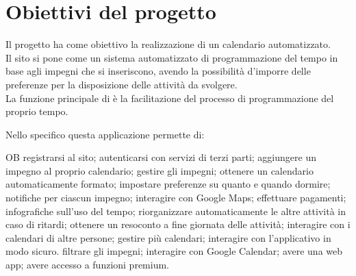 \section{Obiettivi del progetto}
\label{sec:ObiettiviProgetto}
Il progetto ha come obiettivo la realizzazione di un calendario automatizzato.\\
Il sito si pone come un sistema automatizzato di programmazione del tempo in base agli impegni che si inseriscono, avendo la possibilità d'imporre delle preferenze per la disposizione delle attività da svolgere.\\
La funzione principale di \nome è la facilitazione del processo di programmazione del proprio tempo.

\vspace{0.5cm}

Nello specifico questa applicazione permette di:
\begin {mylist} {OB} 
       registrarsi al sito;
       autenticarsi con servizi di terzi parti; 
       aggiungere un impegno al proprio calendario;
       gestire gli impegni; 
       ottenere un calendario automaticamente formato; 
       impostare preferenze su quanto e quando dormire;
       notifiche per ciascun impegno; 
       interagire con Google Maps; 
       effettuare pagamenti;
       infografiche sull'uso del tempo;
       riorganizzare automaticamente le altre attività in caso di ritardi;
       ottenere un resoconto a fine giornata delle attività;
       interagire con i calendari di altre persone;
       gestire più calendari;
       interagire con l'applicativo in modo sicuro. 
       filtrare gli impegni; 
       interagire con Google Calendar;
       avere una web app;
       avere accesso a funzioni premium. 

\end{mylist}
